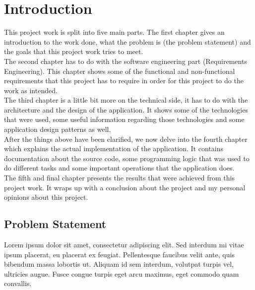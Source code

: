 \chapter{Introduction}
This project work is split into five main parts. 
The first chapter gives an introduction to the work done, what the problem is (the problem statement) and the goals that this project work tries to meet.\\
\newline
The second chapter has to do with the software engineering part (Requirements Engineering). This chapter shows some of the functional and non-functional requirements that this project has to require in order for this project to do the work as intended.\\
\newline
The third chapter is a little bit more on the technical side, it has to do with the architecture and the design of the application. It shows some of the technologies that were used, some useful information regarding those technologies and some application design patterns as well.\\
\newline
After the things above have been clarified, we now delve into the fourth chapter which explains the actual implementation of the application. It contains documentation about the source code, some programming logic that was used to do different tasks and some important operations that the application does.\\
\newline
The fifth and final chapter presents the results that were achieved from this project work. It wraps up with a conclusion about the project and my personal opinions about this project.
\newpage

\section{Problem Statement}
Lorem ipsum dolor sit amet, consectetur adipiscing elit. Sed interdum mi vitae ipsum placerat, eu placerat ex feugiat. Pellentesque faucibus velit ante, quis bibendum massa lobortis ut. Aliquam id sem interdum, volutpat turpis vel, ultricies augue. Fusce congue turpis eget arcu maximus, eget commodo quam convallis. 


